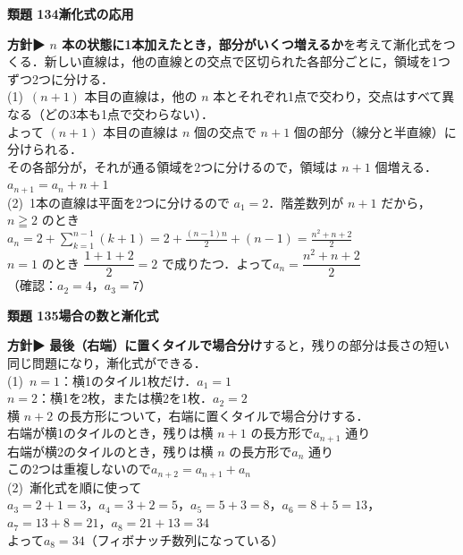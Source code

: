 \documentclass[a4paper,11pt]{ltjsarticle}
\newcommand{\ans}[2]{\Needspace{5\baselineskip}\vspace{6pt}%
  {\sffamily\bfseries 類題 #1\quad #2}\par}
\newcommand{\point}[1]{\textsf{\bfseries ▶ #1}}
\begin{document}
\ans{134}{漸化式の応用}
\begin{kai}
\textbf{方針}\quad \point{$n$ 本の状態に1本加えたとき，部分がいくつ増えるか}を考えて漸化式をつくる．新しい直線は，他の直線との交点で区切られた各部分ごとに，領域を1つずつ2つに分ける．\\[2pt]
(1)\ $(n+1)$ 本目の直線は，他の $n$ 本とそれぞれ1点で交わり，交点はすべて異なる（どの3本も1点で交わらない）．\\
\hspace*{1.5em}よって $(n+1)$ 本目の直線は $n$ 個の交点で $n+1$ 個の部分（線分と半直線）に分けられる．\\
\hspace*{1.5em}その各部分が，それが通る領域を2つに分けるので，領域は $n+1$ 個増える．\\
\hspace*{1.5em}$a_{n+1}=a_n+n+1$\\[2pt]
(2)\ 1本の直線は平面を2つに分けるので $a_1=2$．階差数列が $n+1$ だから，$n\geqq2$ のとき\\
\hspace*{1.5em}$a_n=2+\displaystyle\sum_{k=1}^{n-1}(k+1)=2+\frac{(n-1)n}2+(n-1)=\frac{n^2+n+2}2$\\
\hspace*{1.5em}$n=1$ のとき $\dfrac{1+1+2}2=2$ で成りたつ．\quad よって\quad $a_n=\dfrac{n^2+n+2}2$\\
\hspace*{1.5em}（確認：$a_2=4$，$a_3=7$）
\end{kai}

\ans{135}{場合の数と漸化式}
\begin{kai}
\textbf{方針}\quad \point{最後（右端）に置くタイルで場合分け}すると，残りの部分は長さの短い同じ問題になり，漸化式ができる．\\[2pt]
(1)\ $n=1$：横1のタイル1枚だけ．\quad $a_1=1$\\
\hspace*{1.5em}$n=2$：横1を2枚，または横2を1枚．\quad $a_2=2$\\[2pt]
\hspace*{1.5em}横 $n+2$ の長方形について，右端に置くタイルで場合分けする．\\
\hspace*{1.5em}右端が横1のタイルのとき，残りは横 $n+1$ の長方形で\quad $a_{n+1}$ 通り\\
\hspace*{1.5em}右端が横2のタイルのとき，残りは横 $n$ の長方形で\quad $a_n$ 通り\\
\hspace*{1.5em}この2つは重複しないので\quad $a_{n+2}=a_{n+1}+a_n$\\[2pt]
(2)\ 漸化式を順に使って\\
\hspace*{1.5em}$a_3=2+1=3$，$a_4=3+2=5$，$a_5=5+3=8$，$a_6=8+5=13$，$a_7=13+8=21$，$a_8=21+13=34$\\
\hspace*{1.5em}よって\quad $a_8=34$\quad （フィボナッチ数列になっている）
\end{kai}
\end{document}
